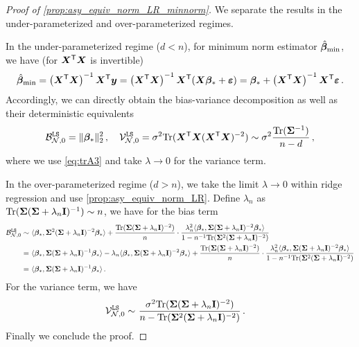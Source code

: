 \begin{proof}[Proof of \cref{prop:asy_equiv_norm_LR_minnorm}]
We separate the results in the under-parameterized and over-parameterized regimes.

In the under-parameterized regime ($d<n$), for minimum norm estimator $\hat{{\boldsymbol \beta}}_{\min}$, we have (for ${\boldsymbol X}^{\mathsf T}{\boldsymbol X}$ is invertible)
\[
\begin{aligned}
    \hat{{\boldsymbol \beta}}_{\min} = \left({\boldsymbol X}^{\mathsf T}{\boldsymbol X}\right)^{-1}{\boldsymbol X}^{\mathsf T}{\boldsymbol y} = \left({\boldsymbol X}^{\mathsf T}{\boldsymbol X}\right)^{-1}{\boldsymbol X}^{\mathsf T}({\boldsymbol X}{\boldsymbol \beta}_*+\bm\varepsilon) = {\boldsymbol \beta}_* + \left({\boldsymbol X}^{\mathsf T}{\boldsymbol X}\right)^{-1}{\boldsymbol X}^{\mathsf T}\bm\varepsilon\,.
\end{aligned}
\]
Accordingly, we can directly obtain the bias-variance decomposition as well as their deterministic equivalents
\[
\begin{aligned}
    \mathcal{B}_{\mathcal{N},0}^{\tt LS} = \|{\boldsymbol \beta}_*\|_2^2\,, \quad \mathcal{V}_{\mathcal{N},0}^{\tt LS} = \sigma^2{\rm Tr}({\boldsymbol X}^{\mathsf T}{\boldsymbol X}({\boldsymbol X}^{\mathsf T}{\boldsymbol X})^{-2}) \sim \sigma^2\frac{{\rm Tr}({\boldsymbol \Sigma}^{-1})}{n-d}\,,
\end{aligned}
\]
where we use \cref{eq:trA3} and take $\lambda \to 0$ for the variance term.

In the over-parameterized regime ($d>n$), we take the limit $\lambda \to 0$ within ridge regression and use \cref{prop:asy_equiv_norm_LR}.
Define $\lambda_n$ as ${\rm Tr}({\boldsymbol \Sigma}({\boldsymbol \Sigma}+\lambda_n{\mathbf I})^{-1}) \sim n$, we have for the bias term
\[
\begin{aligned}
    \mathcal{B}_{\mathcal{N},0}^{\tt LS} \sim &~ \langle{\boldsymbol \beta}_*, {\boldsymbol \Sigma}^2({\boldsymbol \Sigma} + \lambda_n{\mathbf I})^{-2}{\boldsymbol \beta}_*\rangle + \frac{{\rm Tr}({\boldsymbol \Sigma}({\boldsymbol \Sigma} + \lambda_n{\mathbf I})^{-2})}{n} \cdot \frac{\lambda_n^2 \langle{\boldsymbol \beta}_*,{\boldsymbol \Sigma}({\boldsymbol \Sigma} + \lambda_n{\mathbf I})^{-2}{\boldsymbol \beta}_*\rangle}{1-n^{-1}{\rm Tr}({\boldsymbol \Sigma}^2({\boldsymbol \Sigma} + \lambda_n{\mathbf I})^{-2})}\\
    =&~ \langle{\boldsymbol \beta}_*, {\boldsymbol \Sigma}({\boldsymbol \Sigma} + \lambda_n{\mathbf I})^{-1}{\boldsymbol \beta}_*\rangle - \lambda_n \langle{\boldsymbol \beta}_*, {\boldsymbol \Sigma}({\boldsymbol \Sigma} + \lambda_n{\mathbf I})^{-2}{\boldsymbol \beta}_*\rangle + \frac{{\rm Tr}({\boldsymbol \Sigma}({\boldsymbol \Sigma} + \lambda_n{\mathbf I})^{-2})}{n} \cdot \frac{\lambda_n^2 \langle{\boldsymbol \beta}_*,{\boldsymbol \Sigma}({\boldsymbol \Sigma} + \lambda_n{\mathbf I})^{-2}{\boldsymbol \beta}_*\rangle}{1-n^{-1}{\rm Tr}({\boldsymbol \Sigma}^2({\boldsymbol \Sigma} + \lambda_n{\mathbf I})^{-2})}\\
    =&~ \langle{\boldsymbol \beta}_*, {\boldsymbol \Sigma}({\boldsymbol \Sigma} + \lambda_n{\mathbf I})^{-1}{\boldsymbol \beta}_*\rangle\,.
\end{aligned}
\]
For the variance term, we have
\[
\begin{aligned}
    \mathcal{V}_{\mathcal{N},0}^{\tt LS} \sim&~ \frac{\sigma^2{\rm Tr}({\boldsymbol \Sigma}({\boldsymbol \Sigma}+\lambda_n{\mathbf I})^{-2})}{n-{\rm Tr}({\boldsymbol \Sigma}^2({\boldsymbol \Sigma}+\lambda_n{\mathbf I})^{-2})}\,.
\end{aligned}
\]
Finally we conclude the proof.
\end{proof}